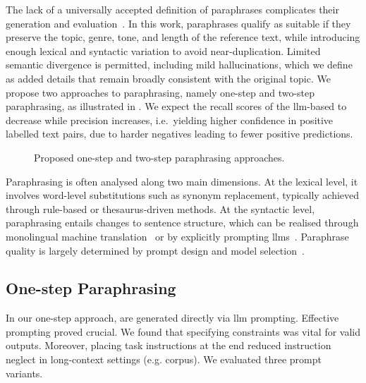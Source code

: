 The lack of a universally accepted definition of paraphrases complicates their generation and evaluation~\citep{gohsen_task_oriented_2024}. 
In this work, paraphrases qualify as suitable \imps{} if they preserve the topic, genre, tone, and length of the reference text, while introducing enough lexical and syntactic variation to avoid near-duplication. 
Limited semantic divergence is permitted, including mild hallucinations, which we define as added details that remain broadly consistent with the original topic.
We propose two approaches to paraphrasing, namely one-step and two-step paraphrasing, as illustrated in .
We expect the recall scores of the \ac{llm}-based \impAppr{} to decrease while precision increases, i.e.\ yielding higher confidence in positive labelled text pairs, due to harder negatives leading to fewer positive predictions.

\begin{figure}[h]
    \centering
    
    \caption[Different paraphrasing approaches]{Proposed one-step and two-step paraphrasing approaches.}
    \label{fig:paraphrasing_approaches}
\end{figure}


Paraphrasing is often analysed along two main dimensions. 
At the lexical level, it involves word-level substitutions such as synonym replacement, typically achieved through rule-based or thesaurus-driven methods. 
At the syntactic level, paraphrasing entails changes to sentence structure, which can be realised through monolingual machine translation~\citep{zhou_paraphrase_2021} or by explicitly prompting \acp{llm}~\citep{kurt_pehlivanoglu_comparative_2024}.
Paraphrase quality is largely determined by prompt design and model selection~\citep{Wu_ODD_challenges_2025}.


\subsection{One-step Paraphrasing}

In our one-step approach, \imps{} are generated directly via \ac{llm} prompting. 
Effective prompting proved crucial. 
We found that specifying constraints was vital for valid outputs. 
Moreover, placing task instructions at the end reduced instruction neglect in long-context settings (e.g. \dataGutenberg{} corpus). 
We evaluated three prompt variants.

